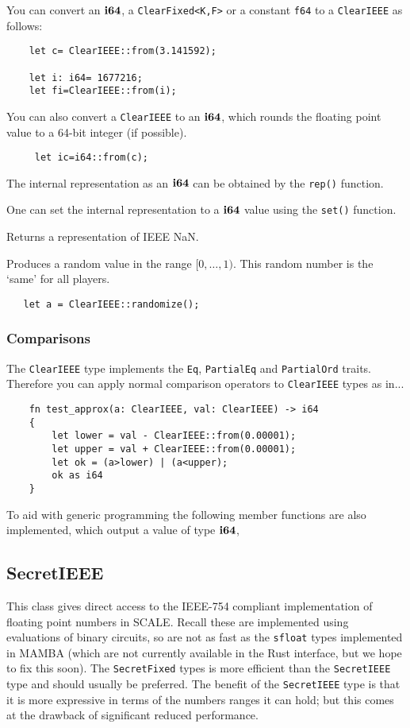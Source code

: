 You can convert an $\mathbf{i64}$, a \verb|ClearFixed<K,F>| 
or a constant \verb|f64| to a \verb|ClearIEEE| as follows:
\begin{lstlisting}
    let c= ClearIEEE::from(3.141592);

    let i: i64= 1677216;
    let fi=ClearIEEE::from(i);
\end{lstlisting}
You can also convert a  \verb|ClearIEEE| to an $\mathbf{i64}$, which rounds the
floating point value to a 64-bit integer (if possible).
\begin{lstlisting}
     let ic=i64::from(c);
\end{lstlisting}

The internal representation as an $\mathbf{i64}$ can be obtained by the
\verb|rep()| function.

One can set the internal representation to a $\mathbf{i64}$ value using
the \verb|set()| function.

Returns a representation of IEEE NaN.

Produces a random value in the range $[0,\ldots,1)$.
This random number is the `same' for all players.
\begin{lstlisting}
   let a = ClearIEEE::randomize();
\end{lstlisting}

\subsubsection{Comparisons}
The \verb|ClearIEEE| type implements the \verb|Eq|, \verb|PartialEq|
and \verb|PartialOrd| traits. Therefore you can apply normal
comparison operators to \verb|ClearIEEE| types as in...
\begin{lstlisting}
    fn test_approx(a: ClearIEEE, val: ClearIEEE) -> i64
    {
        let lower = val - ClearIEEE::from(0.00001);
        let upper = val + ClearIEEE::from(0.00001);
        let ok = (a>lower) | (a<upper);
        ok as i64
    }
\end{lstlisting}
To aid with generic programming the following member functions
are also implemented, which output a value of type $\mathbf{i64}$,


\subsection{SecretIEEE}
This class gives direct access to the IEEE-754 compliant implementation
of floating point numbers in SCALE. Recall these are implemented using
evaluations of binary circuits, so are not as fast as the \verb|sfloat|
types implemented in MAMBA (which are not currently available
in the Rust interface, but we hope to fix this soon).
The \verb|SecretFixed| types is more efficient than the \verb|SecretIEEE|
type and should usually be preferred. The benefit of the
\verb|SecretIEEE| type is that it is more expressive in terms
of the numbers ranges it can hold; but this comes at the drawback
of significant reduced performance.

